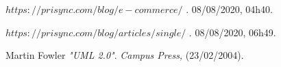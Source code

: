 \begin{thebibliography}{99}
	\begin{math}
	https://prisync.com/blog/e-commerce/ 
	\end{math}	
		. 	08/08/2020, 04h40. 
		
	\begin{math}
	https://prisync.com/blog/articles/single/
	\end{math}	
		. 	08/08/2020, 06h49. 
	
		
	Martin Fowler 
	\textit{"UML 2.0"}. 
	\textit{Campus Press, } (23/02/2004).
	
	
\end{thebibliography}
